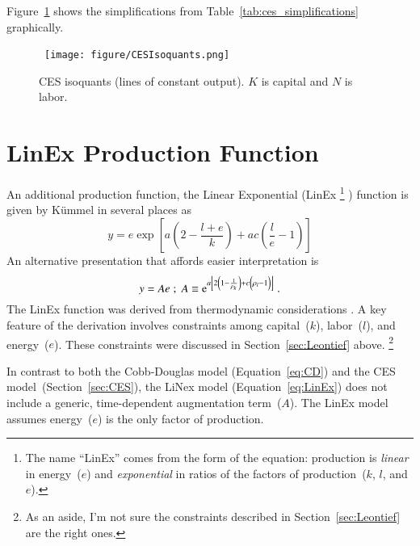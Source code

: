 \documentclass[preprint,authoryear,12pt]{elsarticle}
\begin{document}
Figure~\ref{fig:CES_isoquants} shows the simplifications from Table~\ref{tab:ces_simplifications}
graphically.
%
\begin{figure}[!ht]
\centering\
\texttt{[image: figure/CESIsoquants.png]}
\caption[CES isoquants]{CES isoquants (lines of constant output). 
$K$ is capital and $N$ is labor.~\citep{Klump:2011aa}}
\label{fig:CES_isoquants}
\end{figure}


\section{LinEx Production Function} 
\label{sec:linex}

An additional production function, the Linear Exponential (LinEx%
    \footnote{
    The name ``LinEx'' comes from the form of the equation:
    production is \emph{linear} in energy~($e$) and \emph{exponential}
    in ratios of the factors of production~($k$, $l$, and $e$).
    }%
) function is given by K\"{u}mmel in several places as
%
\begin{equation} \label{eq:LinEx-kummel}
  y = e \exp{\left[ a \left( 2 - \frac{l + e}{k} \right)  + a c \left( \frac{l}{e} - 1 \right)\right]}
\end{equation}
%
An alternative presentation that affords easier interpretation is
%
\begin{equation} \label{eq:LinEx}
  y = A e \; ; \; A \equiv \mathrm{e}^{a\left[2 \left(1 - \frac{1}{\rho_k} \right) 
    + c \left(\vphantom{\frac{1}{\rho_k}}\rho_l - 1 \right)\right]} \; .
\end{equation}
%
The LinEx function was derived from thermodynamic considerations
\citep{Kummel:1980wx,Kummel:1982vy,Kummel:1985vz,Kummel:1989tf,Kummel:2002tx,Kummel:2010vz}. 
A key feature of the derivation involves
constraints among capital~($k$), labor~($l$), and energy~($e$).
These constraints were discussed in Section~\ref{sec:Leontief} above.%
  \footnote{
  As an aside, I'm not sure the constraints 
  described in Section~\ref{sec:Leontief} are the right ones.
  }%

In contrast to both the Cobb-Douglas model (Equation~\ref{eq:CD}) 
and the CES model~(Section~\ref{sec:CES}), 
the LiNex model (Equation~\ref{eq:LinEx}) does not include a generic, 
time-dependent augmentation term~($A$).
The LinEx model assumes energy~($e$) is the only factor of production.
\end{document}
